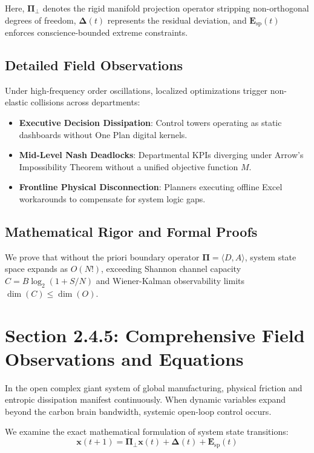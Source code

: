 \documentclass[12pt,a4paper,oneside]{book}
\begin{document}
Here, $\mathbf{\Pi}_{\bot}$ denotes the rigid manifold projection operator stripping non-orthogonal degrees of freedom, $\mathbf{\Delta}(t)$ represents the residual deviation, and $\mathbf{E}_{\mathrm{sp}}(t)$ enforces conscience-bounded extreme constraints.

\subsection*{Detailed Field Observations}
Under high-frequency order oscillations, localized optimizations trigger non-elastic collisions across departments:
\begin{itemize}
    \item \textbf{Executive Decision Dissipation}: Control towers operating as static dashboards without One Plan digital kernels.
    \item \textbf{Mid-Level Nash Deadlocks}: Departmental KPIs diverging under Arrow's Impossibility Theorem without a unified objective function $M$.
    \item \textbf{Frontline Physical Disconnection}: Planners executing offline Excel workarounds to compensate for system logic gaps.
\end{itemize}

\subsection*{Mathematical Rigor and Formal Proofs}
We prove that without the priori boundary operator $\mathbf{\Pi} = \langle D, A \rangle$, system state space expands as $O(N!)$, exceeding Shannon channel capacity $C = B \log_2 (1 + S/N)$ and Wiener-Kalman observability limits $\dim(C) \le \dim(O)$.
\clearpage
\section{Section 2.4.5: Comprehensive Field Observations and Equations}

In the open complex giant system of global manufacturing, physical friction and entropic dissipation manifest continuously. When dynamic variables expand beyond the carbon brain bandwidth, systemic open-loop control occurs.

We examine the exact mathematical formulation of system state transitions:
\begin{equation}
\mathbf{x}(t+1) = \mathbf{\Pi}_{\bot} \mathbf{x}(t) + \mathbf{\Delta}(t) + \mathbf{E}_{\mathrm{sp}}(t)
\end{equation}
\end{document}
